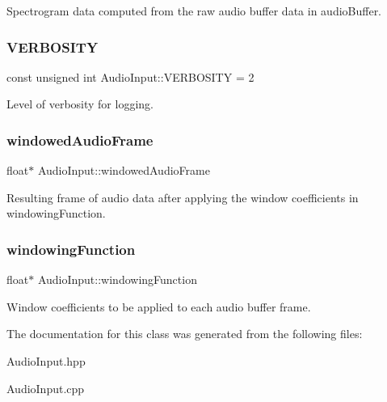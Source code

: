 Spectrogram data computed from the raw audio buffer data in audio\+Buffer. \hypertarget{classAudioInput_aff0f7df20d558ba13f85b3d49b7f42b2}{}\label{classAudioInput_aff0f7df20d558ba13f85b3d49b7f42b2} 
\subsubsection{\texorpdfstring{V\+E\+R\+B\+O\+S\+I\+TY}{VERBOSITY}}
{\ttfamily const unsigned int Audio\+Input\+::\+V\+E\+R\+B\+O\+S\+I\+TY = 2\hspace{0.3cm}{\ttfamily [static]}}

Level of verbosity for logging. \hypertarget{classAudioInput_ae5a196a9ba111b7aa1ef64db6f092432}{}\label{classAudioInput_ae5a196a9ba111b7aa1ef64db6f092432} 
\subsubsection{\texorpdfstring{windowed\+Audio\+Frame}{windowedAudioFrame}}
{\ttfamily float$\ast$ Audio\+Input\+::windowed\+Audio\+Frame\hspace{0.3cm}{\ttfamily [protected]}}

Resulting frame of audio data after applying the window coefficients in windowing\+Function. \hypertarget{classAudioInput_a72417120c208d81359f5b1205fc06664}{}\label{classAudioInput_a72417120c208d81359f5b1205fc06664} 
\subsubsection{\texorpdfstring{windowing\+Function}{windowingFunction}}
{\ttfamily float$\ast$ Audio\+Input\+::windowing\+Function\hspace{0.3cm}{\ttfamily [protected]}}

Window coefficients to be applied to each audio buffer frame. 

The documentation for this class was generated from the following files\+:\begin{DoxyCompactItemize}
\item 
Audio\+Input.\+hpp\item 
Audio\+Input.\+cpp\end{DoxyCompactItemize}
